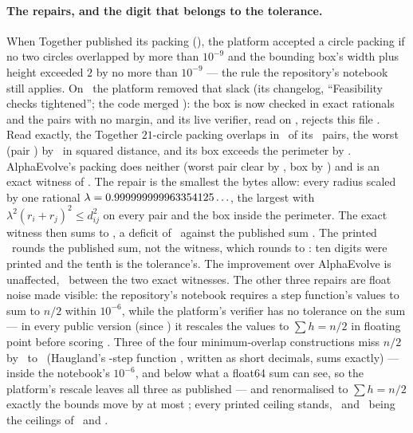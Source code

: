 \documentclass[11pt]{article}
\begin{document}
\paragraph{The repairs, and the digit that belongs to the tolerance.} When Together published its packing
(\CirPublishedOn), the platform accepted a circle packing if no two circles overlapped by more than $10^{-9}$
and the bounding box's width plus height exceeded $2$ by no more than $10^{-9}$ --- the rule the repository's
notebook still applies. On \CirSlackDropped\ the platform removed that slack (its changelog, ``Feasibility
checks tightened''; the code merged \CirSlackMerged): the box is now checked in exact rationals and the pairs
with no margin, and its live verifier, read on \EARuleAsOf, rejects this file \cite{EAP26}. Read exactly, the Together $21$-circle packing overlaps in \CirPairs\ of its
\CirAllPairs\ pairs, the worst (pair \CirWorstPair) by \CirWorst\ in squared distance, and its box exceeds the
perimeter by \CirBox. AlphaEvolve's packing does neither (worst pair clear by \CirAEWorst, box by \CirAEBox)
and is an exact witness of \CirAEPrinted. The repair is the smallest the bytes allow: every radius scaled by
one rational $\lambda=0.999999999963354125\ldots$, the largest with $\lambda^2(r_i+r_j)^2\le d_{ij}^2$ on every pair and the box
inside the perimeter. The exact witness then sums to \CirSumRepaired, a deficit of \CirDeficit\ against the
published sum \CirSumPublished. The printed \CirPrinted\ rounds the published sum, not the witness, which
rounds to \CirRepairRounded: ten digits were printed and the tenth is the tolerance's. The improvement over
AlphaEvolve is unaffected, \CirImprovement\ between the two exact witnesses. The other three repairs are
float noise made visible: the repository's notebook requires a step function's values to sum to $n/2$ within
$10^{-6}$, while the platform's verifier has no tolerance on the sum --- in every public version (since
\OvPlatformSince) it rescales the values to $\sum h=n/2$ in floating point before scoring \cite{EAP26}.
Three of the four minimum-overlap constructions miss $n/2$ by \OvMissMin\ to \OvMissMax\ (Haugland's
\OvHSteps-step function \cite{Ha16}, written as short decimals, sums exactly) --- inside the notebook's
$10^{-6}$, and below what a float64 sum can see, so the platform's rescale leaves all three as published ---
and renormalised to $\sum h=n/2$ exactly the bounds move by at most \OvDeltaMax; every printed ceiling stands, \OvTPrinted\ and
\OvOPrinted\ being the ceilings of \OvTExact\ and \OvOExact.
\end{document}
